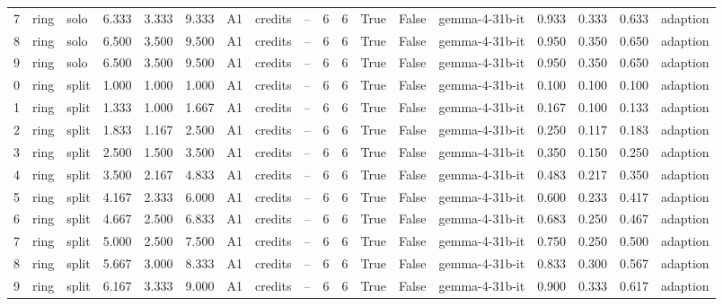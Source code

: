 \begin{table}
\begin{tabular}{rllrrrllrrrrrlrrrl}
7 & ring & solo & 6.333 & 3.333 & 9.333 & A1 & credits & -- & 6 & 6 & True & False & gemma-4-31b-it & 0.933 & 0.333 & 0.633 & adaption \\
8 & ring & solo & 6.500 & 3.500 & 9.500 & A1 & credits & -- & 6 & 6 & True & False & gemma-4-31b-it & 0.950 & 0.350 & 0.650 & adaption \\
9 & ring & solo & 6.500 & 3.500 & 9.500 & A1 & credits & -- & 6 & 6 & True & False & gemma-4-31b-it & 0.950 & 0.350 & 0.650 & adaption \\
0 & ring & split & 1.000 & 1.000 & 1.000 & A1 & credits & -- & 6 & 6 & True & False & gemma-4-31b-it & 0.100 & 0.100 & 0.100 & adaption \\
1 & ring & split & 1.333 & 1.000 & 1.667 & A1 & credits & -- & 6 & 6 & True & False & gemma-4-31b-it & 0.167 & 0.100 & 0.133 & adaption \\
2 & ring & split & 1.833 & 1.167 & 2.500 & A1 & credits & -- & 6 & 6 & True & False & gemma-4-31b-it & 0.250 & 0.117 & 0.183 & adaption \\
3 & ring & split & 2.500 & 1.500 & 3.500 & A1 & credits & -- & 6 & 6 & True & False & gemma-4-31b-it & 0.350 & 0.150 & 0.250 & adaption \\
4 & ring & split & 3.500 & 2.167 & 4.833 & A1 & credits & -- & 6 & 6 & True & False & gemma-4-31b-it & 0.483 & 0.217 & 0.350 & adaption \\
5 & ring & split & 4.167 & 2.333 & 6.000 & A1 & credits & -- & 6 & 6 & True & False & gemma-4-31b-it & 0.600 & 0.233 & 0.417 & adaption \\
6 & ring & split & 4.667 & 2.500 & 6.833 & A1 & credits & -- & 6 & 6 & True & False & gemma-4-31b-it & 0.683 & 0.250 & 0.467 & adaption \\
7 & ring & split & 5.000 & 2.500 & 7.500 & A1 & credits & -- & 6 & 6 & True & False & gemma-4-31b-it & 0.750 & 0.250 & 0.500 & adaption \\
8 & ring & split & 5.667 & 3.000 & 8.333 & A1 & credits & -- & 6 & 6 & True & False & gemma-4-31b-it & 0.833 & 0.300 & 0.567 & adaption \\
9 & ring & split & 6.167 & 3.333 & 9.000 & A1 & credits & -- & 6 & 6 & True & False & gemma-4-31b-it & 0.900 & 0.333 & 0.617 & adaption \\
\bottomrule
\end{tabular}
\end{table}